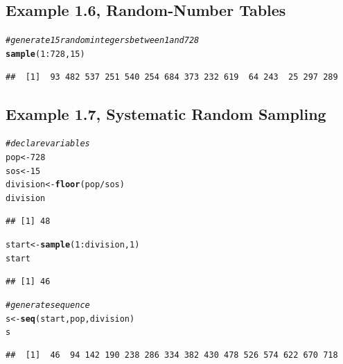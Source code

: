 \documentclass{article}\usepackage[]{graphicx}\usepackage[]{color}
\makeatletter
\newcommand{\hlnum}[1]{\textcolor[rgb]{0.686,0.059,0.569}{#1}}%
\newcommand{\hlcom}[1]{\textcolor[rgb]{0.678,0.584,0.686}{\textit{#1}}}%
\newcommand{\hlopt}[1]{\textcolor[rgb]{0,0,0}{#1}}%
\newcommand{\hlstd}[1]{\textcolor[rgb]{0.345,0.345,0.345}{#1}}%
\newcommand{\hlkwb}[1]{\textcolor[rgb]{0.69,0.353,0.396}{#1}}%
\newcommand{\hlkwd}[1]{\textcolor[rgb]{0.737,0.353,0.396}{\textbf{#1}}}%
\newenvironment{kframe}{%
 \def\at@end@of@kframe{}%
 \ifinner\ifhmode%
  \def\at@end@of@kframe{\end{minipage}}%
  \begin{minipage}{\columnwidth}%
 \fi\fi%
 \def\FrameCommand##1{\hskip\@totalleftmargin \hskip-\fboxsep
 \colorbox{shadecolor}{##1}\hskip-\fboxsep
     \hskip-\linewidth \hskip-\@totalleftmargin \hskip\columnwidth}%
 \MakeFramed {\advance\hsize-\width
   \@totalleftmargin\z@ \linewidth\hsize
   \@setminipage}}%
 {\par\unskip\endMakeFramed%
 \at@end@of@kframe}
\newenvironment{knitrout}{}{} %
\makeatother
\begin{document}
\subsection{Example 1.6, Random-Number Tables}

\begin{knitrout}
\color{fgcolor}\begin{kframe}
\begin{alltt}
\hlcom{#generate 15 random integers between 1 and 728}
\hlkwd{sample}\hlstd{(}\hlnum{1}\hlopt{:}\hlnum{728}\hlstd{,} \hlnum{15}\hlstd{)}
\end{alltt}
\begin{verbatim}
##  [1]  93 482 537 251 540 254 684 373 232 619  64 243  25 297 289
\end{verbatim}
\end{kframe}
\end{knitrout}

\subsection{Example 1.7, Systematic Random Sampling}

\begin{knitrout}
\color{fgcolor}\begin{kframe}
\begin{alltt}
\hlcom{#declare variables}
\hlstd{pop} \hlkwb{<-} \hlnum{728}
\hlstd{sos} \hlkwb{<-} \hlnum{15}
\hlstd{division} \hlkwb{<-} \hlkwd{floor}\hlstd{(pop} \hlopt{/} \hlstd{sos)}
\hlstd{division}
\end{alltt}
\begin{verbatim}
## [1] 48
\end{verbatim}
\begin{alltt}
\hlstd{start} \hlkwb{<-} \hlkwd{sample}\hlstd{(}\hlnum{1}\hlopt{:}\hlstd{division,} \hlnum{1}\hlstd{)}
\hlstd{start}
\end{alltt}
\begin{verbatim}
## [1] 46
\end{verbatim}
\begin{alltt}
\hlcom{#generate sequence}
\hlstd{s} \hlkwb{<-} \hlkwd{seq}\hlstd{(start, pop, division)}
\hlstd{s}
\end{alltt}
\begin{verbatim}
##  [1]  46  94 142 190 238 286 334 382 430 478 526 574 622 670 718
\end{verbatim}
\end{kframe}
\end{knitrout}
\end{document}
